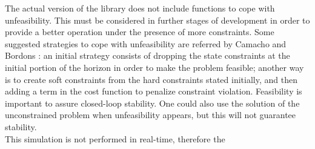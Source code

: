 The actual version of the library does not include functions to cope with unfeasibility. This must be considered in further stages of development in order to provide a better operation under the presence of more constraints. Some suggested strategies to cope with unfeasibility are referred by Camacho and Bordons \cite{CamachoBordons}: an initial strategy consists of dropping the state constraints at the initial portion of the horizon in order to make the problem feasible; another way is to create soft constraints from the hard constraints stated initially, and then adding a term in the cost function to penalize constraint violation. Feasibility is important to assure closed-loop stability. One could also use the solution of the unconstrained problem  when unfeasibility appears, but this will not guarantee stability.\\

This simulation is not performed in real-time, therefore the 



